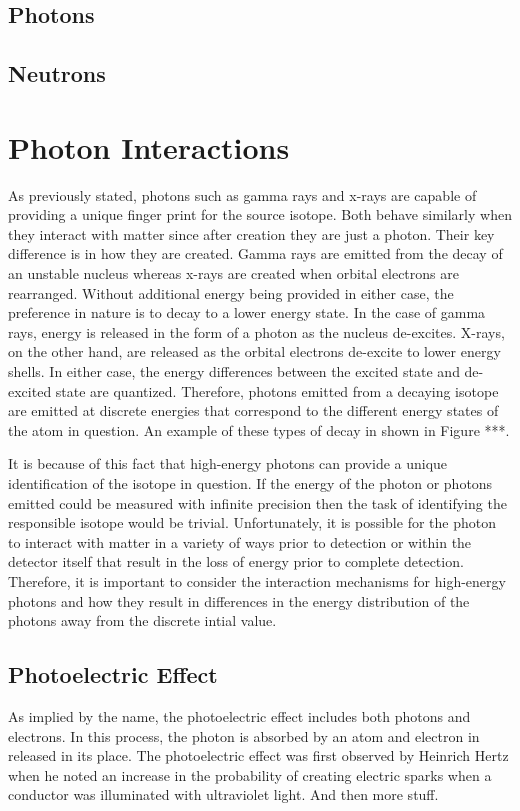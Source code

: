 \subsection{Photons}
\subsection{Neutrons}

\section{Photon Interactions}
As previously stated, photons such as gamma rays and x-rays are capable of providing a unique finger print for the source isotope.  Both behave similarly when they interact with matter since after creation they are just a photon.  Their key difference is in how they are created.  Gamma rays are emitted from the decay of an unstable nucleus whereas x-rays are created when orbital electrons are rearranged.  Without additional energy being provided in either case, the preference in nature is to decay to a lower energy state.  In the case of gamma rays, energy is released in the form of a photon as the nucleus de-excites.  X-rays, on the other hand, are released as the orbital electrons de-excite to lower energy shells.  In either case, the energy differences between the excited state and de-excited state are quantized.    Therefore, photons emitted from a decaying isotope are emitted at discrete energies that correspond to the different energy states of the atom in question.  An example of these types of decay in shown in Figure ***.  


It is because of this fact that high-energy photons can provide a unique identification of the isotope in question.  If the energy of the photon or photons emitted could be measured with infinite precision then the task of identifying the responsible isotope would be trivial.  Unfortunately, it is possible for the photon to interact with matter in a variety of ways prior to detection or within the detector itself that result in the loss of energy prior to complete detection.  Therefore, it is important to consider the interaction mechanisms for high-energy photons and how they result in differences in the energy distribution of the photons away from the discrete intial value.

\subsection{Photoelectric Effect}
As implied by the name, the photoelectric effect includes both photons and electrons.  In this process, the photon is absorbed by an atom and electron in released in its place.  The photoelectric effect was first observed by Heinrich Hertz when he noted an increase in the probability of creating electric sparks when a conductor was illuminated with ultraviolet light. \cite{hertz1887} And then more stuff.

